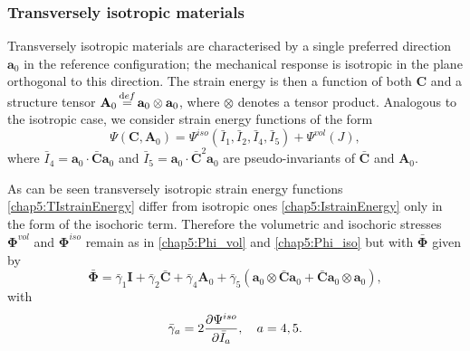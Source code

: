 	\subsubsection*{Transversely isotropic materials}
Transversely isotropic materials are characterised by a single preferred direction $\mathbf{a}_0$ in the reference configuration; the mechanical response is isotropic in the plane orthogonal to this direction. The strain energy is then a function of both $  \mathbf{C} $ and a structure tensor $\mathbf{A}_0 \, {\buildrel\mathrm	def\over=} \,  \mathbf{a}_0 \otimes \mathbf{a}_0$, where $\otimes$ denotes a tensor product. Analogous to the isotropic case, we consider strain energy functions of the form	
\begin{equation}
\label{chap5:TIstrainEnergy}
\Psi (\mathbf{C}, \mathbf{A}_0) = \Psi^{iso}(\bar{I}_1, \bar{I}_2, \bar{I}_4, \bar{I}_5) + \Psi^{vol}(J),
\end{equation}
where $ \bar{I}_4 = \mathbf{a}_0 \cdot \mathbf{\bar{C}} \mathbf{a}_0$ and $ \bar{I}_5 = \mathbf{a}_0 \cdot \mathbf{\bar{C}}^2 \mathbf{a}_0 $ are pseudo-invariants of $ \mathbf{\bar{C}} $ and $ \mathbf{A}_0 $. 

\bigskip

\noindent As can be seen transversely isotropic strain energy functions \eqref{chap5:TIstrainEnergy} differ from isotropic ones \eqref{chap5:IstrainEnergy} only in the form of the isochoric term. Therefore the volumetric and isochoric stresses $ \boldsymbol \Phi^{vol} $ and $ \boldsymbol \Phi^{iso} $ remain as in \eqref{chap5:Phi_vol} and \eqref{chap5:Phi_iso} but with $\bar{\boldsymbol \Phi} $ given by
\begin{equation}
\label{chap5:PhiBarTI}
\bar{\boldsymbol \Phi} = \bar{\gamma}_1 \mathbf{I} + \bar{\gamma}_2 \mathbf{\bar{C}} + \bar{\gamma}_4 \mathbf{A}_0 + \bar{\gamma}_5 ( \mathbf{a}_0 \otimes \mathbf{\bar{C}} \mathbf{a}_0 +  \mathbf{\bar{C}} \mathbf{a}_0 \otimes \mathbf{a}_0 ),
\end{equation}
with 
\begin{equation}
\bar{\gamma}_a = 2 \dfrac{\partial \Psi^{iso}}{\partial \bar{I}_a}, \quad a = 4, 5.
\end{equation}

	
